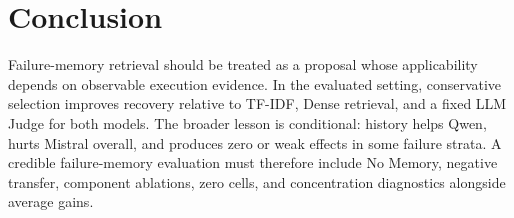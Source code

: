 \section{Conclusion}

Failure-memory retrieval should be treated as a proposal whose applicability depends on observable execution evidence. In the evaluated setting, conservative selection improves recovery relative to TF-IDF, Dense retrieval, and a fixed LLM Judge for both models. The broader lesson is conditional: history helps Qwen, hurts Mistral overall, and produces zero or weak effects in some failure strata. A credible failure-memory evaluation must therefore include No Memory, negative transfer, component ablations, zero cells, and concentration diagnostics alongside average gains.

